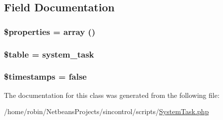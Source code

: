 \subsection{Field Documentation}
\hypertarget{class_system_task_a7f675de4b5983d7e84f6573b7d4d453d}{}
\subsubsection[{\$properties}]{\setlength{\rightskip}{0pt plus 5cm}\$properties = array ()\hspace{0.3cm}{\ttfamily [private]}}\label{class_system_task_a7f675de4b5983d7e84f6573b7d4d453d}
\hypertarget{class_system_task_ae8876a14058f368335baccf35af4a22b}{}
\subsubsection[{\$table}]{\setlength{\rightskip}{0pt plus 5cm}\$table = \textquotesingle{}system\+\_\+task\textquotesingle{}\hspace{0.3cm}{\ttfamily [protected]}}\label{class_system_task_ae8876a14058f368335baccf35af4a22b}
\hypertarget{class_system_task_a51267c24c8fae742ed8f9be0ba6085ee}{}
\subsubsection[{\$timestamps}]{\setlength{\rightskip}{0pt plus 5cm}\$timestamps = false}\label{class_system_task_a51267c24c8fae742ed8f9be0ba6085ee}


The documentation for this class was generated from the following file\+:\begin{DoxyCompactItemize}
\item 
/home/robin/\+Netbeans\+Projects/sincontrol/scripts/\hyperlink{scripts_2_system_task_8php}{System\+Task.\+php}\end{DoxyCompactItemize}
